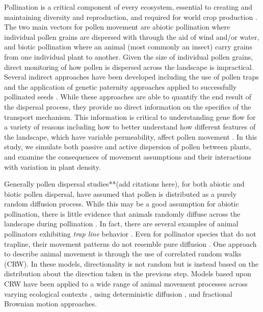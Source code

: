 Pollination is a critical component of every ecosystem, essential to creating
and maintaining diversity and reproduction, and required for world crop
production \cite{KleinEtAl2007}.  The two main vectors for pollen movement are
abiotic pollination where individual pollen grains are dispersed with through
the aid of wind and/or water, and biotic pollination where an animal (most
commonly an insect) carry grains from one individual plant to another.  Given
the size of individual pollen grains, direct monitoring of how pollen is
dispersed across the landscape is impractical.  Several indirect approaches have
been developed including the use of pollen traps and the application of genetic
paternity approaches applied to successfully pollinated seeds
\cite{BitzerPatterson1967,StreiffEtAl1999}.  While these approaches are able to
quantify the end result of the dispersal process, they provide no direct
information on the specifics of the transport mechanism.  This information is
critical to understanding gene flow for a variety of reasons including how to
better understand how different features of the landscape, which have variable
permeability, affect pollen movement \cite{DyerSork2001,DyerEtAl2012}. In this
study, we simulate both passive and active dispersion of pollen between plants,
and examine the consequences of movement assumptions and their interactions
with variation in plant density.

Generally pollen dispersal studies**(add citations here), for both abiotic and
biotic pollen dispersal, have assumed that pollen is distributed as a purely
random diffusion process.  While this may be a good assumption for abiotic
pollination, there is little evidence that animals randomly diffuse across the
landscape during pollination \cite{LevinKerster}.  In fact, there are several
examples of animal pollinators exhibiting \emph{trap line} behavior \cite[e.g.,
repeated sequential visits to individual plants]{OhashiThomson}.  Even for
pollinator species that do not trapline, their movement patterns do not resemble
pure diffusion \cite{Cresswell03}. One approach to describe animal movement is
through the use of correlated random walks (CRW).  In these models,
directionality is not random but is instead based on the distribution about the
direction taken in the previous step.  Models based upon CRW have been applied
to a wide range of animal movement processes across varying ecological contexts
\cite{Bartumeus07,Byers01}, using deterministic diffusion \cite{Klages}, and
fractional Brownian motion \cite{Enriquez} approaches.

